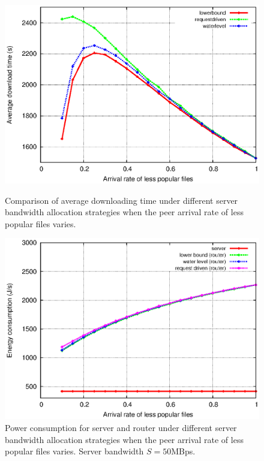 \documentclass[conference]{IEEEtran}
\begin{document}
\begin{figure}[ht]
\centering
\begin{minipage}[b]{0.3\linewidth}
	\includegraphics[scale=0.4]{graphs/pop.eps}
	\caption{Comparison of average downloading time under different server bandwidth allocation strategies when the peer arrival rate of less popular files varies.}
	\label{fig:popsimulation}
\end{minipage}
\hfill
\centering
\begin{minipage}[b]{0.3\linewidth}
	\includegraphics[scale=0.4]{graphs/componentconsumption.eps}
	\caption{Power consumption for server and router under different server bandwidth allocation strategies when the peer arrival rate of less popular files varies. Server bandwidth $S=50$MBps.}
	\label{fig:componentpop}
\end{minipage}

\end{figure}
\end{document}
